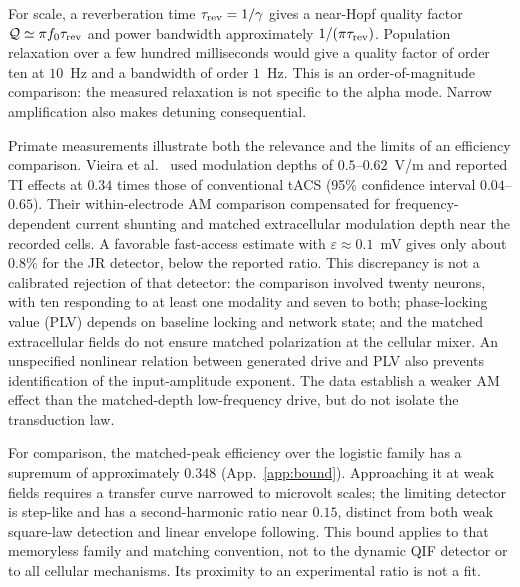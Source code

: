\documentclass[11pt,a4paper]{article}
\begin{document}
For scale, a reverberation time $\tau_{\rm rev}=1/\gamma$ gives a near-Hopf
quality factor $\mathcal Q\simeq\pi f_0\tau_{\rm rev}$ and power bandwidth
approximately $1/(\pi\tau_{\rm rev})$. Population relaxation over a few hundred
milliseconds \cite{wilting2018} would give a quality factor of order ten at
$10$~Hz and a bandwidth of order $1$~Hz. This is an order-of-magnitude comparison:
the measured relaxation is not specific to the alpha mode. Narrow amplification
also makes detuning consequential.

Primate measurements illustrate both the relevance and the limits of an efficiency
comparison. Vieira et al.\ \cite{vieira2024} used modulation depths of
$0.5$--$0.62$~V/m and reported TI effects at $0.34$ times those of conventional
tACS (95\% confidence interval $0.04$--$0.65$). Their within-electrode AM comparison
compensated for frequency-dependent current shunting and matched extracellular
modulation depth near the recorded cells. A favorable fast-access estimate with
$\varepsilon\approx0.1$~mV gives only about $0.8\%$ for the JR detector, below the
reported ratio. This discrepancy is not a calibrated rejection of that detector:
the comparison involved twenty neurons, with ten responding to at least one
modality and seven to both; phase-locking value (PLV) depends on baseline locking
and network state; and the matched extracellular fields do not ensure matched
polarization at the cellular mixer. An unspecified nonlinear relation between
generated drive and PLV also prevents identification of the input-amplitude
exponent. The data establish a weaker AM effect than the matched-depth
low-frequency drive, but do not isolate the transduction law.

For comparison, the matched-peak efficiency over the logistic family has a supremum
of approximately $0.348$ (App.~\ref{app:bound}). Approaching it at weak fields
requires a transfer curve narrowed to microvolt scales; the limiting detector is
step-like and has a second-harmonic ratio near $0.15$, distinct from both weak
square-law detection and linear envelope following. This bound applies to that
memoryless family and matching convention, not to the dynamic QIF detector or to
all cellular mechanisms. Its proximity to an experimental ratio is not a fit.
\end{document}
